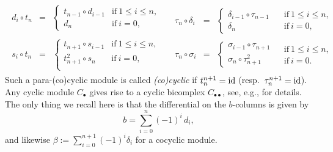 \documentclass[reqno, a4paper, 10pt]{amsart}
\numberwithin{equation}{section}
\theoremstyle{plain}
\theoremstyle{definition}
\theoremstyle{remark}
\begin{document}
\begin{equation}\label{belleville}
\!\!\!\!\!\!\!\!
\begin{array}{cc}
\begin{array}{rcl}
d_i \circ t_n  &\!\!\!\!\!\!=&\!\!\!\!\!\! \left\{\!\!\!
\begin{array}{ll}
t_{n-1} \circ d_{i-1} 
& \!\!\!\! \mbox{if} \ 1 \leq i \leq n, \\
 d_n & \!\!\!\! \mbox{if} \
i = 0,
\end{array}\right. \\
\\
s_i \circ t_n &\!\!\!\!\!\!=&\!\!\!\!\!\! \left\{\!\!\!
\begin{array}{ll}
t_{n+1} \circ s_{i-1} & \!\!\!\!
\mbox{if} \ 1 \leq i \leq n, \\
 t^2_{n+1} \circ s_n
 & \!\!\!\! \mbox{if} \
i = 0, \\
\end{array}\right.
\end{array}
\!\!\!\!&\!\!\!\!
\begin{array}{rcll}
\tau_n \circ {\delta}_i &\!\!\!\!\!=&\!\!\!\!\! \left\{\!\!\!
\begin{array}{l}
{\delta}_{i-1}\circ \tau_{n-1} \\
 {\delta}_n 
\end{array}\right. & \!\!\!\!\!\!\!\!\! \begin{array}{l} \mbox{if} \ 1
\leq i \leq n, 
 \\ \mbox{if} \ i = 0,
 \end{array} \\
\\
\tau_n \circ \sigma_i &\!\!\!\!\!=&\!\!\!\!\! \left\{\!\!\!
\begin{array}{l}
\sigma_{i-1} \circ \tau_{n+1} \\
 \sigma_n \circ \tau^2_{n+1} 
\end{array}\right. & \!\!\!\!\!\!\!\!\!
\begin{array}{l} \mbox{if} \ 1 \leq i
 \leq n,  
\\ \mbox{if} \ i = 0. \end{array} 
\end{array}
\end{array}
\end{equation}
Such a para-(co)cyclic module is called {\em (co)cyclic} if $t^{n+1}_n = {{\rm id}}$ (resp.\ $\tau^{n+1}_n = {{\rm id}}$).
Any cyclic module $C_{{\scriptscriptstyle{\bullet}}}$ 
gives rise to a cyclic bicomplex $C_{{{\scriptscriptstyle{\bullet}}}{{\scriptscriptstyle{\bullet}}}}$, see, e.g., \cite{FeiTsy:AKT} for details. The only thing we recall here is that the differential on the $b$-columns is given by
\begin{equation}
\label{Eq:b}
b = \sum_{i=0}^{n} (-1)^i\, d_i, 
\end{equation}
and likewise $\beta := \sum^{n+1}_{i=0} (-1)^i {\delta}_i$ for a cocyclic module.
\end{document}
